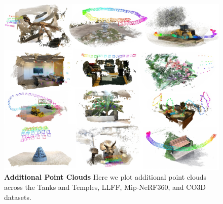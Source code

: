 \begin{figure}[th]
    \centering
    \includegraphics[width=\linewidth,]{figures/pdfs/point_clouds_more_compressed.pdf}
    \caption{\textbf{Additional Point Clouds} Here we plot additional point clouds across the Tanks and Temples, LLFF, Mip-NeRF360, and CO3D datasets.}
    \label{fig:add_clouds}
\end{figure}
